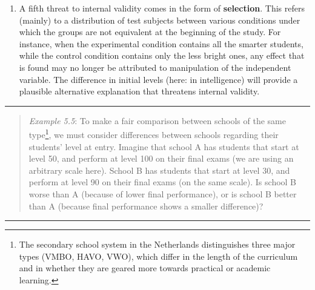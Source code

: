 \documentclass[
]{book}
\providecommand{\tightlist}{%
  \setlength{\itemsep}{0pt}\setlength{\parskip}{0pt}}
\begin{document}
\begin{enumerate}
\def\labelenumi{\arabic{enumi}.}
\setcounter{enumi}{4}
\tightlist
\item
  A fifth threat to internal validity comes in the form of \textbf{selection}. This refers (mainly) to a distribution of test subjects between various conditions under which the groups are not equivalent at the beginning of the study. For instance, when the experimental condition contains all the smarter students, while the control condition contains only the less bright ones, any effect that is found may no longer be attributed to manipulation of the independent variable. The difference in initial levels (here: in intelligence) will provide a plausible alternative explanation that threatens internal validity.
\end{enumerate}

\begin{center}\rule{0.5\linewidth}{0.5pt}\end{center}

\begin{quote}
\emph{Example 5.5}: To make a fair comparison between schools of the same type\footnote{The secondary school system in the Netherlands distinguishes three major types (VMBO, HAVO, VWO), which differ in the length of the curriculum and in whether they are geared more towards practical or academic learning.}, we must consider differences between schools regarding their students' level at entry. Imagine that school A has students that start at level 50, and perform at level 100 on their final exams (we are using an arbitrary scale here). School B has students that start at level 30, and perform at level 90 on their final exams (on the same scale). Is school B worse than A (because of lower final performance), or is school B better than A (because final performance shows a smaller difference)?
\end{quote}

\begin{center}\rule{0.5\linewidth}{0.5pt}\end{center}
\end{document}
